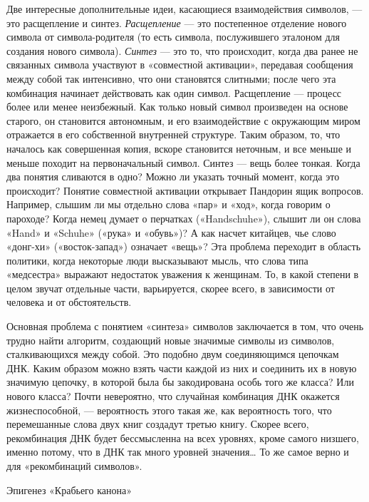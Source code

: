 \documentclass[../main.tex]{subfiles}
\begin{document}
Две интересные дополнительные идеи, касающиеся взаимодействия символов, --- это расщепление и синтез. \emph{Расщепление} --- это постепенное отделение нового символа от символа-родителя (то есть символа, послужившего эталоном для создания нового символа). \emph{Синтез} --- это то, что происходит, когда два ранее не связанных символа участвуют в «совместной активации», передавая сообщения между собой так интенсивно, что они становятся слитными; после чего эта комбинация начинает действовать как один символ. Расщепление --- процесс более или менее неизбежный. Как только новый символ произведен на основе старого, он становится автономным, и его взаимодействие с окружающим миром отражается в его собственной внутренней структуре. Таким образом, то, что началось как совершенная копия, вскоре становится неточным, и все меньше и меньше походит на первоначальный символ. Синтез --- вещь более тонкая. Когда два понятия сливаются в одно? Можно ли указать точный момент, когда это происходит? Понятие совместной активации открывает Пандорин ящик вопросов. Например, слышим ли мы отдельно слова «пар» и «ход», когда говорим о пароходе? Когда немец думает о перчатках («Handschuhe»), слышит ли он слова «Hand» и «Schuhe» («рука» и «обувь»)? А как насчет китайцев, чье слово «донг-хи» («восток-запад») означает «вещь»? Эта проблема переходит в область политики, когда некоторые люди высказывают мысль, что слова типа «медсестра» выражают недостаток уважения к женщинам. То, в какой степени в целом звучат отдельные части, варьируется, скорее всего, в зависимости от человека и от обстоятельств.

Основная проблема с понятием «синтеза» символов заключается в том, что очень трудно найти алгоритм, создающий новые значимые символы из символов, сталкивающихся между собой. Это подобно двум соединяющимся цепочкам ДНК. Каким образом можно взять части каждой из них и соединить их в новую значимую цепочку, в которой была бы закодирована особь того же класса? Или нового класса? Почти невероятно, что случайная комбинация ДНК окажется жизнеспособной, --- вероятность этого такая же, как вероятность того, что перемешанные слова двух книг создадут третью книгу. Скорее всего, рекомбинация ДНК будет бессмысленна на всех уровнях, кроме самого низшего, именно потому, что в ДНК так много уровней значения\ldots{} То же самое верно и для «рекомбинаций символов».

Эпигенез «Крабьего канона»
\end{document}
